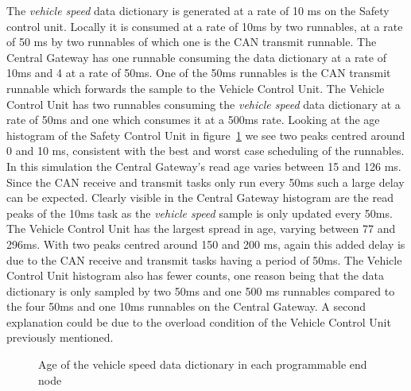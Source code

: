 The \textit{vehicle speed} data dictionary is generated at a rate of 10 ms on the Safety control unit. Locally it is consumed at a rate of 10ms by two runnables, at a rate of 50 ms by two runnables of which one is the CAN transmit runnable. The Central Gateway has one runnable consuming the data dictionary at a rate of 10ms and 4 at a rate of 50ms. One of the 50ms runnables is the CAN transmit runnable which forwards the sample to the Vehicle Control Unit. The Vehicle Control Unit has two runnables consuming the \textit{vehicle speed} data dictionary at a rate of 50ms and one which consumes it at a 500ms rate. Looking at the age histogram of the Safety Control Unit in figure~\ref{fig:vehicle_speed} we see two peaks centred around 0 and 10 ms, consistent with the best and worst case scheduling of the runnables. In this simulation the Central Gateway's read age varies between 15 and 126 ms. Since the CAN receive and transmit tasks only run every 50ms such a large delay can be expected. Clearly visible in the Central Gateway histogram are the read peaks of the 10ms task as the \textit{vehicle speed} sample is only updated every 50ms. The Vehicle Control Unit has the largest spread in age, varying between 77 and 296ms. With two peaks centred around 150 and 200 ms, again this added delay is due to the CAN receive and transmit tasks having a period of 50ms. The Vehicle Control Unit histogram also has fewer counts, one reason being that the data dictionary is only sampled by two 50ms and one 500 ms runnables compared to the four 50ms and one 10ms runnables on the Central Gateway. A second explanation could be due to the overload condition of the Vehicle Control Unit previously mentioned.
\begin{figure}[htb]
    \centering
    
    \caption{Age of the vehicle speed data dictionary in each programmable end node}
    \label{fig:vehicle_speed}
\end{figure}

